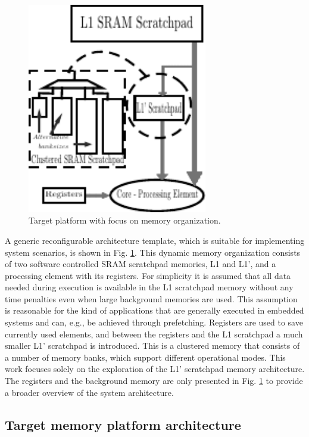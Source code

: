 \begin{figure}
	\centering
	\includegraphics[width=0.7\textwidth]{Images/platform.pdf}
	\caption{Target platform with focus on memory organization. }
	\label{fig:pltfrm}
\end{figure}

A generic reconfigurable architecture template, which is suitable for implementing system scenarios, is shown in Fig. \ref{fig:pltfrm}. 
This dynamic memory organization consists of two software controlled SRAM scratchpad memories, L1 and L1', and a processing element with its registers. 
For simplicity it is assumed that all data needed during execution is available in the L1 scratchpad memory without any time penalties even when large background memories are used. 
This assumption is reasonable for the kind of applications that are generally executed in embedded systems and can, e.g., be achieved through prefetching. 
Registers are used to save currently used elements, and between the registers and the L1 scratchpad a much smaller L1' scratchpad is introduced. 
This is a clustered memory that consists of a number of memory banks, which support different operational modes.
This work focuses solely on the exploration of the L1' scratchpad memory architecture.
The registers and the background memory are only presented in Fig. \ref{fig:pltfrm} to provide a broader overview of the system architecture.

\subsection{Target memory platform architecture}

